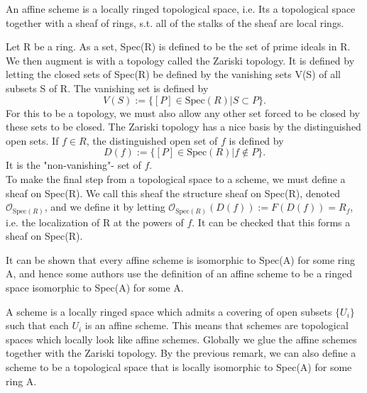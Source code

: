 
\begin{definition}\label{Def:Affine scheme}
An affine scheme is a locally ringed topological space, i.e. Its a topological space together with a sheaf of rings, s.t. all of the stalks of the sheaf are local rings. 
\end{definition}

\begin{definition}\label{Def:Spectrum of a ring}
Let R be a ring. As a set, Spec(R) is defined to be the set of prime ideals in R. We then augment is with a topology called the Zariski topology. It is defined by letting the closed sets of Spec(R) be defined by the vanishing sets V(S) of all subsets S of R. The vanishing set is defined by
%
\begin{equation*}
    V(S) := \{[P] \in \text{Spec}(R) | S \subset P \}.
\end{equation*}
%
For this to be a topology, we must also allow any other set forced to be closed by these sets to be closed. The Zariski topology has a nice basis by the distinguished open sets. If \(f\in R\), the distinguished open set of \(f\) is defined by
%
\begin{equation*}
    D(f) := \{[P] \in \text{Spec}(R) | f \notin P \}.
\end{equation*}
%
It is the "non-vanishing"- set of \(f\). \\
To make the final step from a topological space to a scheme, we must define a sheaf on Spec(R). We call this sheaf the structure sheaf on Spec(R), denoted \(\mathcal{O}_{\text{Spec}(R)}\), and we define it by letting \(\mathcal{O}_{\text{Spec}(R)}(D(f)) := F(D(f)) = R_f\), i.e. the localization of R at the powers of \(f\). It can be checked that this forms a sheaf on Spec(R). \\
%
\begin{remark}
It can be shown that every affine scheme is isomorphic to Spec(A) for some ring A, and hence some authors use the definition of an affine scheme to be a ringed space isomorphic to Spec(A) for some A. 
\end{remark}
%
\end{definition}

\begin{definition}\label{Def:Scheme}
A scheme is a locally ringed space which admits a covering of open subsets \(\{U_i\}\) such that each \(U_i\) is an affine scheme. This means that schemes are topological spaces which locally look like affine schemes. Globally we glue the affine schemes together with the Zariski topology. By the previous remark, we can also define a scheme to be a topological space that is locally isomorphic to Spec(A) for some ring A. 
\end{definition}

